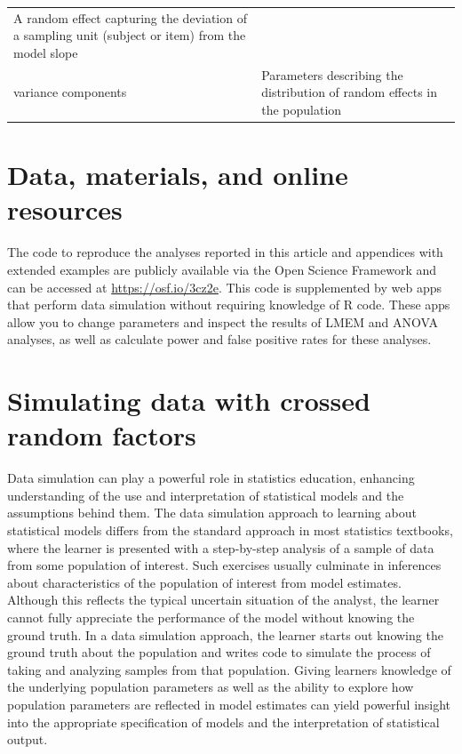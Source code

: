 \documentclass[
  english,
  doc,floatsintext]{apa6}
\begin{document}
\begin{tcolorbox}[colback=black!5!white,colframe=white!5!black,title=Box 1. Glossary of terms]
\begin{longtable}[]{@{}ll@{}}
\begin{minipage}[t]{0.65\columnwidth}
A random effect capturing the deviation of a sampling unit (subject or item) from the model slope\strut
\end{minipage}\tabularnewline
\begin{minipage}[t]{0.29\columnwidth}\raggedright
variance components\strut
\end{minipage} & \begin{minipage}[t]{0.65\columnwidth}\raggedright
Parameters describing the distribution of random effects in the
population\strut
\end{minipage}\tabularnewline
\end{longtable}
\end{tcolorbox}

\hypertarget{data-materials-and-online-resources}{%
\section{Data, materials, and online resources}\label{data-materials-and-online-resources}}

The code to reproduce the analyses reported in this article and appendices with extended examples are publicly available via the Open Science Framework and can be accessed at \url{https://osf.io/3cz2e}. This code is supplemented by web apps that perform data simulation without requiring knowledge of R code. These apps allow you to change parameters and inspect the results of LMEM and ANOVA analyses, as well as calculate power and false positive rates for these analyses.

\hypertarget{simulating-data-with-crossed-random-factors}{%
\section{Simulating data with crossed random factors}\label{simulating-data-with-crossed-random-factors}}

Data simulation can play a powerful role in statistics education, enhancing understanding of the use and interpretation of statistical models and the assumptions behind them. The data simulation approach to learning about statistical models differs from the standard approach in most statistics textbooks, where the learner is presented with a step-by-step analysis of a sample of data from some population of interest. Such exercises usually culminate in inferences about characteristics of the population of interest from model estimates. Although this reflects the typical uncertain situation of the analyst, the learner cannot fully appreciate the performance of the model without knowing the ground truth. In a data simulation approach, the learner starts out knowing the ground truth about the population and writes code to simulate the process of taking and analyzing samples from that population. Giving learners knowledge of the underlying population parameters as well as the ability to explore how population parameters are reflected in model estimates can yield powerful insight into the appropriate specification of models and the interpretation of statistical output.
\end{document}
